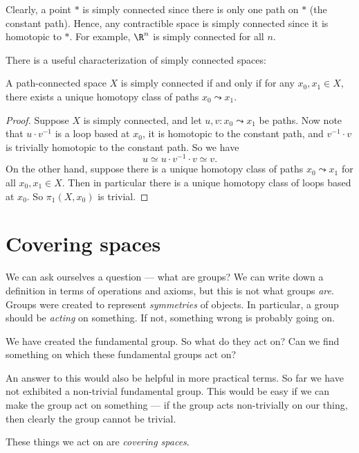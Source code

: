 \documentclass[a4paper]{article}
\begin{document}
\begin{eg}
  Clearly, a point $*$ is simply connected since there is only one path on $*$ (the constant path). Hence, any contractible space is simply connected since it is homotopic to $*$. For example, $\R^n$ is simply connected for all $n$.
\end{eg}

There is a useful characterization of simply connected spaces:
\begin{lemma}
  A path-connected space $X$ is simply connected if and only if for any $x_0, x_1\in X$, there exists a unique homotopy class of paths $x_0 \leadsto x_1$.
\end{lemma}

\begin{proof}
  Suppose $X$ is simply connected, and let $u, v: x_0 \leadsto x_1$ be paths. Now note that $u \cdot v^{-1}$ is a loop based at $x_0$, it is homotopic to the constant path, and $v^{-1} \cdot v$ is trivially homotopic to the constant path. So we have
  \[
    u \simeq u \cdot v^{-1} \cdot v \simeq v.
  \]
  On the other hand, suppose there is a unique homotopy class of paths $x_0 \leadsto x_1$ for all $x_0, x_1 \in X$. Then in particular there is a unique homotopy class of loops based at $x_0$. So $\pi_1(X, x_0)$ is trivial.
\end{proof}

\section{Covering spaces}
We can ask ourselves a question --- what are groups? We can write down a definition in terms of operations and axioms, but this is not what groups \emph{are}. Groups were created to represent \emph{symmetries} of objects. In particular, a group should be \emph{acting} on something. If not, something wrong is probably going on.

We have created the fundamental group. So what do they act on? Can we find something on which these fundamental groups act on?

An answer to this would also be helpful in more practical terms. So far we have not exhibited a non-trivial fundamental group. This would be easy if we can make the group act on something --- if the group acts non-trivially on our thing, then clearly the group cannot be trivial.

These things we act on are \emph{covering spaces}.
\end{document}
